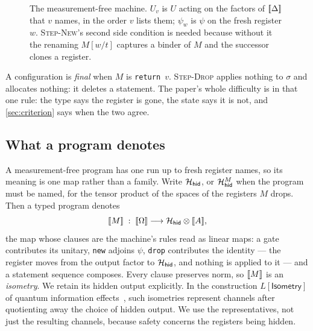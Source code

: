 \documentclass[acmsmall,screen,review,anonymous,nonacm]{acmart}
\begin{document}
\begin{figure}[htbp]
\caption{The measurement-free machine. $U_v$ is $U$ acting on the factors
of $[\![\Delta]\!]$ that $v$ names, in the order $v$ lists them; $\psi_w$ is $\psi$ on
the fresh register $w$. \textsc{Step-New}'s second side condition is needed because
without it the renaming $M[w/t]$ captures a binder of $M$ and the successor clones a
register.}
\label{fig:machine}
\end{figure}

A configuration is
\emph{final} when $M$ is \texttt{return }$v$. \textsc{Step-Drop} applies nothing to
$\sigma$ and allocates nothing: it deletes a statement. The paper's whole difficulty
is in that one rule: the type says the register is gone, the state says it is not,
and \cref{sec:criterion} says when the two agree.

\subsection{What a program denotes}\label{sec:lang:denotation}

A measurement-free program has one run up to fresh register names, so
its meaning is one map rather than a family.
Write $\mathcal{H}_{\mathsf{hid}}$, or $\mathcal{H}_{\mathsf{hid}}^M$ when the program must be named, for the
tensor product of the spaces of the registers $M$ drops. Then a
typed program denotes
\[
  [\![M]\!] \;:\; [\![\Omega]\!] \longrightarrow \mathcal{H}_{\mathsf{hid}} \otimes [\![A]\!],
\]
the map whose clauses are the machine's rules read as linear maps: a gate contributes
its unitary, \texttt{new} adjoins $\psi$, \texttt{drop} contributes the identity ---
the register moves from the output factor to $\mathcal{H}_{\mathsf{hid}}$, and nothing is applied to it ---
and a statement sequence composes. Every clause preserves norm, so $[\![M]\!]$ is an
\emph{isometry}. We retain its hidden output explicitly. In the
construction $L[\mathsf{Isometry}]$ of quantum information
effects~\cite{Heunen2022QIE}, such isometries represent channels after
quotienting away the choice of hidden output. We use the representatives,
not just the resulting channels, because safety concerns the registers
being hidden.
\end{document}
